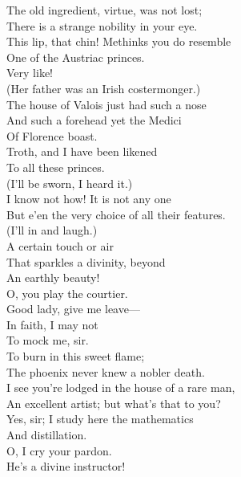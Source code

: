 \documentclass[a4paper,oneside,12pt]{memoir}
\begin{document}
\begin{drama*}
The old ingredient, virtue, was not lost;\\
There is a strange nobility in your eye.\\
This lip, that chin! Methinks you do resemble\\
One of the Austriac princes.\\
\facespeaks {} Very like!\\
(Her father was an Irish costermonger.)\\
\mammonspeaks The house of Valois just had such a nose\\
And such a forehead yet the Medici\\
Of Florence boast.\\
\dolspeaks {} Troth, and I have been likened\\
To all these princes.\\
\facespeaks {} (I'll be sworn, I heard it.)\\
\mammonspeaks I know not how! It is not any one\\
But e'en the very choice of all their features.\\
\facespeaks (I'll in and laugh.)\\
\mammonspeaks {} A certain touch or air\\
That sparkles a divinity, beyond\\
An earthly beauty!\\
\dolspeaks {} O, you play the courtier.\\
\mammonspeaks Good lady, give me leave---\\
\dolspeaks {} In faith, I may not\\
To mock me, sir.\\
\mammonspeaks {} To burn in this sweet flame;\\
The phoenix never knew a nobler death.\\
I see you're lodged in the house of a rare man,\\
An excellent artist; but what's that to you?\\
\dolspeaks Yes, sir; I study here the mathematics\\
And distillation.\\
\mammonspeaks {} O, I cry your pardon.\\
He's a divine instructor!

\end{drama*}
\end{document}
